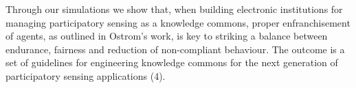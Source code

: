 Through our simulations we show that, when building electronic institutions for managing participatory sensing as a knowledge commons, proper enfranchisement of agents, as outlined in Ostrom's work, is key to striking a balance between endurance, fairness and reduction of non-compliant behaviour. The outcome is a set of guidelines for engineering knowledge commons for the next generation of participatory sensing applications (4).


